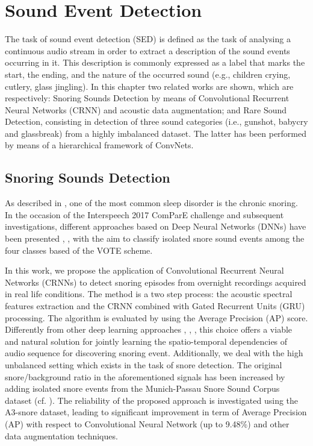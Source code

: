\chapter{Sound Event Detection}

The task of sound event detection (SED) is defined as the task of analysing a continuous audio stream in order to extract a description of the sound events occurring in it. This description is commonly expressed as a label that marks the start, the ending, and the nature of the occurred sound (e.g., children crying, cutlery, glass jingling). In this chapter two related works are shown, which are respectively: Snoring Sounds Detection by means of Convolutional Recurrent Neural Networks (CRNN) and acoustic data augmentation; and Rare Sound Detection, consisting in detection of three sound categories (i.e., gunshot, babycry and glassbreak) from a highly imbalanced dataset. The latter has been performed by means of a hierarchical framework of ConvNets.

\section{Snoring Sounds Detection}

As described in , one of the most common sleep disorder is the chronic snoring. In the occasion of the Interspeech 2017 ComParE challenge \cite{ComParE2017} and subsequent investigations, different approaches based on Deep Neural Networks (DNNs) have been presented \cite{amiriparian2017snore}, \cite{freitag2017end}, \cite{vesperini2018snore} with the aim to classify isolated snore sound events among the four classes based of the VOTE scheme.

In this work, we propose the application of Convolutional Recurrent Neural Networks (CRNNs) to detect snoring episodes from overnight recordings acquired in real life conditions. The method is a two step process: the acoustic spectral features extraction and the CRNN combined with Gated Recurrent Units (GRU) processing. The algorithm is evaluated by using the Average Precision (AP) score.
Differently from other deep learning approaches \cite{amiriparian2017snore}, \cite{freitag2017end}, \cite{vesperini2018snore}, this choice offers a viable and natural solution for jointly learning the spatio-temporal dependencies of audio sequence for discovering snoring event. Additionally, we deal with the high unbalanced setting which exists in the task of snore detection. The original snore/background ratio in the aforementioned signals has been increased by adding isolated snore events from the Munich-Passau Snore Sound Corpus dataset \cite{ComParE2017} (cf. ). The reliability of the proposed approach is investigated using the A3-snore dataset, leading to significant improvement in term of Average Precision (AP) with respect to Convolutional Neural Network (up to 9.48\%) and other data augmentation techniques.


